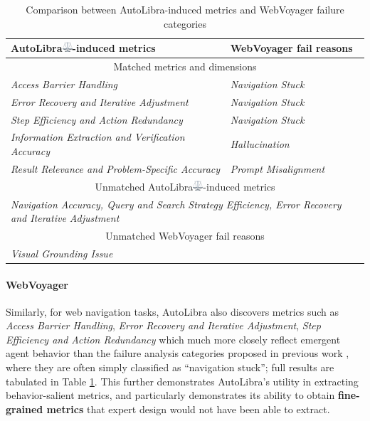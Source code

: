 \begin{table}[!h]
\centering
\begin{tabular}{ll}
    \toprule
    AutoLibra\protect\includegraphics[height=1em]{figs/scale.png}-induced metrics & WebVoyager fail reasons\\
    \midrule
    \multicolumn{2}{c}{Matched metrics and dimensions}\\\midrule
    \textit{Access Barrier Handling} & \textit{Navigation Stuck} \\
    \textit{Error Recovery and Iterative Adjustment} & \textit{Navigation Stuck}\\
    \textit{Step Efficiency and Action Redundancy} & \textit{Navigation Stuck}\\ 
    \textit{Information Extraction and Verification Accuracy} & \textit{Hallucination} \\
    \textit{Result Relevance and Problem-Specific Accuracy} & \textit{Prompt Misalignment}\\
    \midrule
    \multicolumn{2}{c}{Unmatched AutoLibra\protect\includegraphics[height=1em]{figs/scale.png}-induced metrics}\\\midrule
     \multicolumn{2}{C{0.8\textwidth}}{\textit{Navigation Accuracy, Query and Search Strategy Efficiency, Error Recovery and Iterative Adjustment}} \\ \midrule
     \multicolumn{2}{c}{Unmatched WebVoyager fail reasons}\\\midrule
     \multicolumn{2}{C{0.8\textwidth}}{\textit{Visual Grounding Issue}} \\\bottomrule
\end{tabular}
\caption{Comparison between AutoLibra-induced metrics and WebVoyager failure categories}
\label{tab:lens_wv}
\end{table}

\paragraph{WebVoyager} Similarly, for web navigation tasks, AutoLibra also discovers metrics such as \textit{Access Barrier Handling}, \textit{Error Recovery and Iterative Adjustment}, \textit{Step Efficiency and Action Redundancy} which much more closely reflect emergent agent behavior than the failure analysis categories proposed in previous work \citep{he2024webvoyager,zhou2024proposeragentevaluatorpaeautonomousskilldiscovery}, where they are often simply classified as ``navigation stuck''; full results are tabulated in Table \ref{tab:lens_wv}. This further demonstrates AutoLibra's utility in extracting behavior-salient metrics, and particularly demonstrates its ability to obtain \textbf{fine-grained metrics} that expert design would not have been able to extract. 



